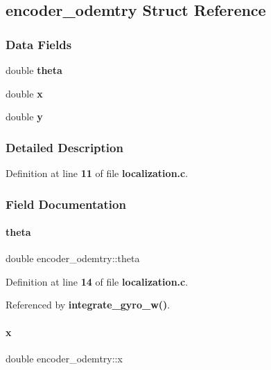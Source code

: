 \subsection{encoder\+\_\+odemtry Struct Reference}
\label{structencoder__odemtry}
\subsubsection*{Data Fields}
\begin{DoxyCompactItemize}
\item 
double \textbf{ theta}
\item 
double \textbf{ x}
\item 
double \textbf{ y}
\end{DoxyCompactItemize}


\subsubsection{Detailed Description}


Definition at line \textbf{ 11} of file \textbf{ localization.\+c}.



\subsubsection{Field Documentation}
\mbox{\label{structencoder__odemtry_af1a1e2a2a7a2f89138a8c261a3b82898}} 
\paragraph{theta}
{\footnotesize\ttfamily double encoder\+\_\+odemtry\+::theta}



Definition at line \textbf{ 14} of file \textbf{ localization.\+c}.



Referenced by \textbf{ integrate\+\_\+gyro\+\_\+w()}.

\mbox{\label{structencoder__odemtry_a9a803978381f9b89a031d520a627cbcf}} 
\paragraph{x}
{\footnotesize\ttfamily double encoder\+\_\+odemtry\+::x}



